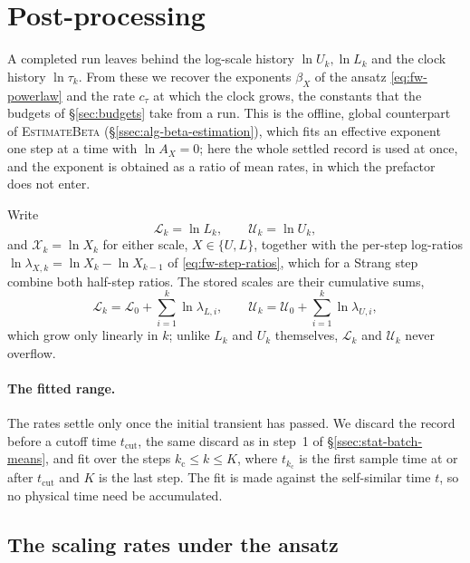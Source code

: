\documentclass{article}
\begin{document}
\section{Post-processing}\label{sec:postproc}

A completed run leaves behind the log-scale history $\ln U_k, \ln L_k$ and the
clock history $\ln \tau_k$. From these we recover the exponents $\beta_X$ of
the ansatz \eqref{eq:fw-powerlaw} and the rate $c_\tau$ at which the clock
grows, the constants that the budgets of \S\ref{sec:budgets} take from a run.
This is the offline, global counterpart of \textsc{EstimateBeta}
(\S\ref{ssec:alg-beta-estimation}), which fits an effective exponent one
step at a time with $\ln A_X = 0$; here the whole settled record is used at
once, and the exponent is obtained as a ratio of mean rates, in which the
prefactor does not enter.

Write
\begin{equation}\label{eq:pp-logs}
  \mathcal{L}_k = \ln L_k, \qquad \mathcal{U}_k = \ln U_k,
\end{equation}
and $\mathcal{X}_k = \ln X_k$ for either scale, $X \in \{U, L\}$, together
with the per-step log-ratios $\ln \lambda_{X,k} = \ln X_k - \ln X_{k-1}$
of \eqref{eq:fw-step-ratios}, which for a Strang step combine both half-step
ratios. The stored scales are their cumulative sums,
\begin{equation}\label{eq:pp-cumsum}
  \mathcal{L}_k = \mathcal{L}_0 + \sum_{i=1}^{k} \ln \lambda_{L,i},
  \qquad
  \mathcal{U}_k = \mathcal{U}_0 + \sum_{i=1}^{k} \ln \lambda_{U,i},
\end{equation}
which grow only linearly in $k$; unlike $L_k$ and $U_k$ themselves,
$\mathcal{L}_k$ and $\mathcal{U}_k$ never overflow.

\paragraph{The fitted range.} The rates settle only once the initial
transient has passed. We discard the record before a cutoff time
$t_{\mathrm{cut}}$, the same discard as in step~1 of
\S\ref{ssec:stat-batch-means}, and fit over the steps
$k_{\mathrm{c}} \le k \le K$, where $t_{k_{\mathrm{c}}}$ is the first sample
time at or after $t_{\mathrm{cut}}$ and $K$ is the last step. The fit is made
against the self-similar time $t$, so no physical time need be accumulated.

\subsection{The scaling rates under the ansatz}\label{ssec:pp-rates}
\end{document}
